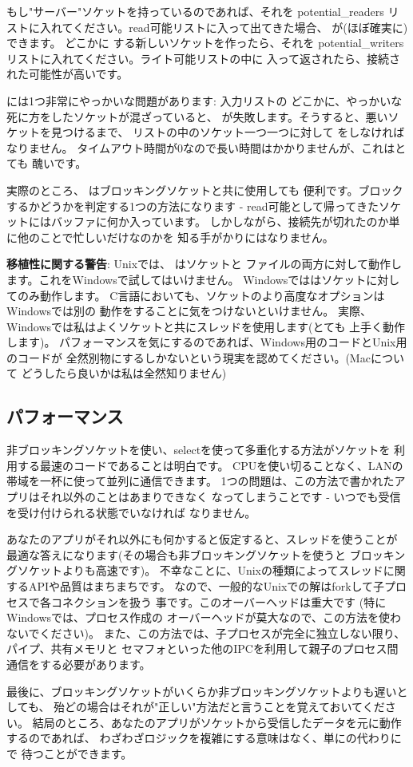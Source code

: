 \documentclass{howto}
\begin{document}
もし"サーバー"ソケットを持っているのであれば、それを potential_readers
リストに入れてください。read可能リストに入って出てきた場合、
が(ほぼ確実に)できます。
どこかに  する新しいソケットを作ったら、それを
potential_writers リストに入れてください。ライト可能リストの中に
入って返されたら、接続された可能性が高いです。

には1つ非常にやっかいな問題があります: 入力リストの
どこかに、やっかいな死に方をしたソケットが混ざっていると、
 が失敗します。そうすると、悪いソケットを見つけるまで、
リストの中のソケット一つ一つに対して  
をしなければなりません。
タイムアウト時間が0なので長い時間はかかりませんが、これはとても
醜いです。

実際のところ、 はブロッキングソケットと共に使用しても
便利です。ブロックするかどうかを判定する1つの方法になります -
read可能として帰ってきたソケットにはバッファに何か入っています。
しかしながら、接続先が切れたのか単に他のことで忙しいだけなのかを
知る手がかりにはなりません。

\textbf{移植性に関する警告}: Unixでは、 はソケットと
ファイルの両方に対して動作します。これをWindowsで試してはいけません。
Windowsでははソケットに対してのみ動作します。
C言語においても、ソケットのより高度なオプションはWindowsでは別の
動作をすることに気をつけないといけません。
実際、Windowsでは私はよくソケットと共にスレッドを使用します(とても
上手く動作します)。
パフォーマンスを気にするのであれば、Windows用のコードとUnix用のコードが
全然別物にするしかないという現実を認めてください。(Macについて
どうしたら良いかは私は全然知りません)

\subsection{パフォーマンス}

非ブロッキングソケットを使い、selectを使って多重化する方法がソケットを
利用する最速のコードであることは明白です。
CPUを使い切ることなく、LANの帯域を一杯に使って並列に通信できます。
1つの問題は、この方法で書かれたアプリはそれ以外のことはあまりできなく
なってしまうことです - いつでも受信を受け付けられる状態でいなければ
なりません。

あなたのアプリがそれ以外にも何かすると仮定すると、スレッドを使うことが
最適な答えになります(その場合も非ブロッキングソケットを使うと
ブロッキングソケットよりも高速です)。
不幸なことに、Unixの種類によってスレッドに関するAPIや品質はまちまちです。
なので、一般的なUnixでの解はforkして子プロセスで各コネクションを扱う
事です。このオーバーヘッドは重大です (特にWindowsでは、プロセス作成の
オーバーヘッドが莫大なので、この方法を使わないでください)。
また、この方法では、子プロセスが完全に独立しない限り、パイプ、共有メモリと
セマフォといった他のIPCを利用して親子のプロセス間通信をする必要があります。

最後に、ブロッキングソケットがいくらか非ブロッキングソケットよりも遅いとしても、
殆どの場合はそれが"正しい"方法だと言うことを覚えておいてください。
結局のところ、あなたのアプリがソケットから受信したデータを元に動作するのであれば、
わざわざロジックを複雑にする意味はなく、単にの代わりにで
待つことができます。
\end{document}
